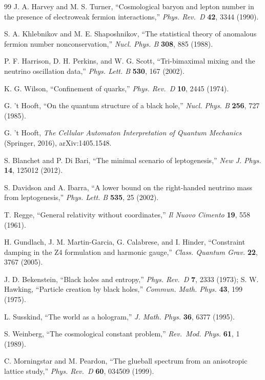 \documentclass[aps,prd,twocolumn,amsmath,amssymb,superscriptaddress,nofootinbib,floatfix]{revtex4-2}
\begin{document}
\begin{thebibliography}{99}
 J. A. Harvey and M. S. Turner, ``Cosmological baryon and lepton number
in the presence of electroweak fermion interactions,'' \emph{Phys.
Rev.~D} \textbf{42}, 3344 (1990).

 S. A. Khlebnikov and M. E. Shaposhnikov, ``The statistical theory of
anomalous fermion number nonconservation,'' \emph{Nucl. Phys. B}
\textbf{308}, 885 (1988).

 P. F. Harrison, D. H. Perkins, and W. G. Scott, ``Tri-bimaximal mixing
and the neutrino oscillation data,'' \emph{Phys. Lett. B} \textbf{530},
167 (2002).

 K. G. Wilson, ``Confinement of quarks,'' \emph{Phys. Rev.~D}
\textbf{10}, 2445 (1974).

 G. 't Hooft, ``On the quantum structure of a black hole,'' \emph{Nucl.
Phys. B} \textbf{256}, 727 (1985).

 G. 't Hooft, \emph{The Cellular Automaton Interpretation of Quantum
Mechanics} (Springer, 2016), arXiv:1405.1548.

 S. Blanchet and P. Di Bari, ``The minimal scenario of leptogenesis,''
\emph{New J. Phys.} \textbf{14}, 125012 (2012).

 S. Davidson and A. Ibarra, ``A lower bound on the right-handed neutrino
mass from leptogenesis,'' \emph{Phys. Lett. B} \textbf{535}, 25 (2002).

 T. Regge, ``General relativity without coordinates,'' \emph{Il Nuovo
Cimento} \textbf{19}, 558 (1961).

 H. Gundlach, J. M. Martin-Garcia, G. Calabrese, and I. Hinder,
``Constraint damping in the Z4 formulation and harmonic gauge,''
\emph{Class. Quantum Grav.} \textbf{22}, 3767 (2005).

 J. D. Bekenstein, ``Black holes and entropy,'' \emph{Phys. Rev.~D}
\textbf{7}, 2333 (1973); S. W. Hawking, ``Particle creation by black
holes,'' \emph{Commun. Math. Phys.} \textbf{43}, 199 (1975).

 L. Susskind, ``The world as a hologram,'' \emph{J. Math. Phys.}
\textbf{36}, 6377 (1995).

 S. Weinberg, ``The cosmological constant problem,'' \emph{Rev.~Mod.
Phys.} \textbf{61}, 1 (1989).

 C. Morningstar and M. Peardon, ``The glueball spectrum from an
anisotropic lattice study,'' \emph{Phys. Rev.~D} \textbf{60}, 034509
(1999).


\end{thebibliography}
\end{document}
